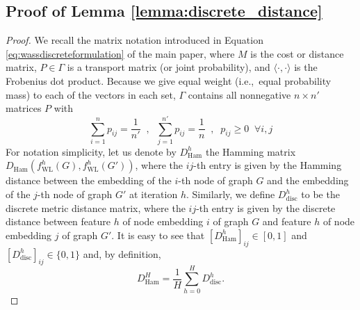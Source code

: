 \documentclass{article}
\begin{document}
\subsection{Proof of Lemma \ref{lemma:discrete_distance}}
\label{proof:discrete_distance}
\begin{proof}
We recall the matrix notation introduced in Equation \ref{eq:wassdiscreteformulation} of the main paper, where $M$ is the cost or distance matrix, $P \in \Gamma$ is a transport matrix (or joint probability), and $\langle \cdot, \cdot \rangle$ is the Frobenius dot product.
Because we give equal weight (i.e.,\ equal probability mass) to each of the vectors in each set, $\Gamma$ contains all nonnegative $n \times n'$ matrices $P$ with
$$
\sum_{i=1}^{n} p_{ij} = \frac{1}{n'} \;\;,\;\;
\sum_{j=1}^{n'} p_{ij} = \frac{1}{n} \;\;,\;\;
p_{ij} \geq 0 \;\; \forall i, j
$$
  For notation simplicity, let us denote by $D_{\mathrm{Ham}}^h$ the Hamming matrix $D_{\mathrm{Ham}}(f^h_{\mathrm{\scriptscriptstyle{WL}}}(G), f^h_{\mathrm{\scriptscriptstyle{WL}}}(G'))$, where the $ij$-th entry is given by the Hamming distance between the embedding of the $i$-th node of graph $G$ and the embedding of the $j$-th node of graph $G'$ at iteration $h$. 
Similarly, we define $D_{\mathrm{disc}}^h$ to be the discrete metric distance matrix, where the $ij$-th entry is given by the discrete distance between feature $h$ of node embedding $i$ of graph $G$ and feature $h$ of node embedding $j$ of graph $G'$.
  It is easy to see that $[D_{\mathrm{Ham}}^h]_{ij} \in [0,1]$ and $[D_{\mathrm{disc}}^h]_{ij} \in \{0,1\}$ and, by definition,
$$
D_{\mathrm{Ham}}^H = \frac{1}{H} \sum_{h=0}^H D_{\mathrm{disc}}^h.
$$


\end{proof}
\end{document}
